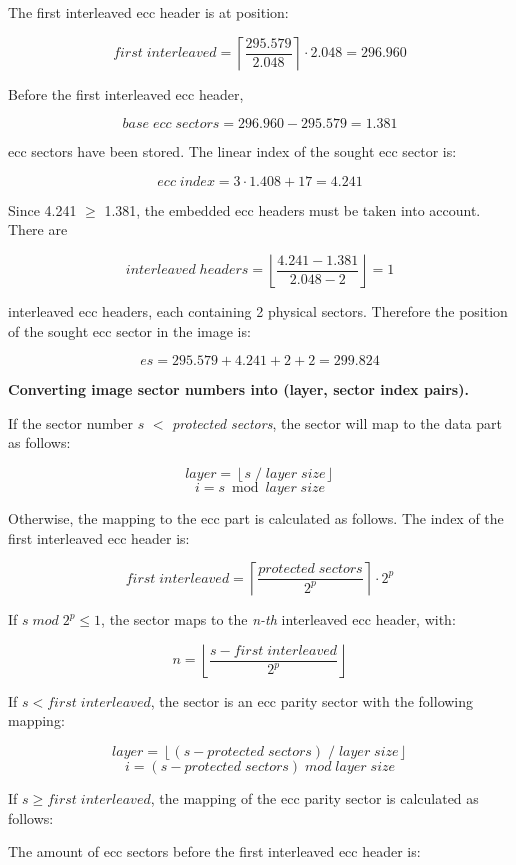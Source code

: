 The first interleaved ecc header is at position:

\[ first\; interleaved = \left\lceil\frac{295.579}{2.048}\right\rceil \cdot 2.048 = 296.960 \]

Before the first interleaved ecc header,

\[ base\; ecc\; sectors = 296.960 - 295.579 = 1.381 \]

ecc sectors have been stored. The linear index of the sought ecc sector is:

\[ ecc\; index = 3 \cdot 1.408 + 17 = 4.241 \]

Since 4.241 $\ge$ 1.381, the embedded ecc headers must be taken into account. There are

\[ interleaved \; headers = \left\lfloor\frac{4.241 - 1.381}{2.048-2}\right\rfloor = 1 \]

interleaved ecc headers, each containing 2 physical sectors. Therefore the position
of the sought ecc sector in the image is:

\[ es = 295.579 + 4.241 + 2 + 2 = 299.824 \]

\bigskip

{\bf Converting image sector numbers into (layer, sector index pairs).}

\smallskip

If the sector number $s$ $<$ {\em protected sectors}, the sector will map to the data part
as follows:

\[layer = \left\lfloor s\; /\; layer\;size \right\rfloor\]
\[i = s \bmod layer\;size\]

Otherwise, the mapping to the ecc part is calculated as follows. The index of the first interleaved ecc header is:

\[ first\; interleaved = \left\lceil\frac{protected\; sectors}{2^p}\right\rceil \cdot 2^p\]

If $s\; mod\; 2^p \le 1$, the sector maps to the {\em n-th} interleaved ecc header, with:

\[n = \left\lfloor\frac{s - first\; interleaved}{2^p}\right\rfloor\] 

If $s < first\; interleaved$, the sector is an ecc parity sector with the following mapping:

\[ layer = \left\lfloor(s - protected\; sectors)\; /\; layer\; size\right\rfloor\]
\[ i = (s - protected\; sectors)\; mod\; layer\;size\]

If $s \ge first\; interleaved$, the mapping of the ecc parity sector is calculated as follows:

The amount of ecc sectors before the first interleaved ecc header is:

